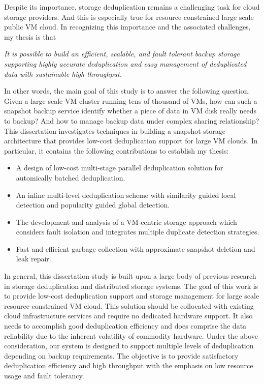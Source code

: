 Despite its importance, storage deduplication remains a challenging task for cloud storage providers. 
And this is especially true for resource constrained large scale public VM cloud. 
In recognizing this importance and
the associated challenges,  my thesis is that

\textit{It  is  possible  to  build  an efficient, scalable, and fault tolerant backup storage
supporting highly accurate deduplication and easy management of deduplicated data
with sustainable high throughput.}

In  other  words,  the  main  goal  of this  study  is  to  answer  the  following 
question.  Given a large scale VM cluster running tens of thousand of VMs, 
how can such a snapshot backup service identify whether a piece of data in VM disk
really needs to backup? And how to manage backup data under complex sharing relationship?
This dissertation investigates 
techniques  in  building  a snapshot storage architecture that provides 
low-cost deduplication support for large VM clouds.  In particular,  it 
contains the following contributions to establish my thesis:

\begin{itemize}
\item A design of low-cost multi-stage parallel deduplication solution for automically batched deduplication.
\item An inline multi-level deduplication scheme with similarity guided local detection and popularity guided global detection.
\item The development and analysis of a VM-centric storage approach which considers fault isolation and integrates multiple duplicate detection strategies.
\item Fast and efficient garbage collection with approximate snapshot deletion and leak repair.
\end{itemize}

In general, this  dissertation  study  is  built  upon  a  large  body  of previous  research 
in storage deduplication and distributed storage systems.  The goal 
of this work is to provide low-cost deduplication support and storage management for 
large scale resource-constrained VM cloud. This solution should be collocated with existing
cloud infrastructure services and require no dedicated hardware support. It also needs to
accomplish good deduplication efficiency and does comprise the data reliability due to the
inherent volatility of commodity hardware.
Under the  above consideration, our system is designed to support multiple levels of deduplication
depending on backup requirements. The objective is to provide satisfactory deduplication efficiency
and high throughput with the emphasis on low resource usage and fault tolerancy.

